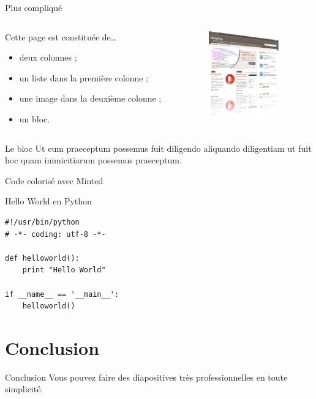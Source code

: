 \documentclass[utf8,compress]{beamer}
\begin{document}
\begin{frame}{Plus compliqué}
\begin{columns}
\begin{column}{0.7\textwidth}
    Cette page est constituée de\dots
    \begin{itemize}
    \item deux colonnes ;
    \item un liste dans la première colonne ;
    \item une image dans la deuxième colonne ;
    \item un bloc.
    \end{itemize}
\end{column}
\begin{column}{0.3\textwidth}
    \begin{figure}[h]
        \includegraphics[width=3cm]{bloghiko-reflet3d.png}
    \end{figure}
\end{column}
\end{columns}
\vspace{1em}
\begin{block}{Le bloc}
    Ut eum praeceptum possemus fuit diligendo aliquando diligentiam ut 
    fuit hoc quam inimicitiarum possemus praeceptum.
\end{block}
\end{frame}

\begin{frame}[containsverbatim]{Code colorisé avec Minted}
\begin{exampleblock}{Hello World en Python}
\begin{verbatim}
#!/usr/bin/python
# -*- coding: utf-8 -*-

def helloworld():
    print "Hello World"

if __name__ == '__main__':
    helloworld()
\end{verbatim}
\end{exampleblock}
\end{frame}

\section{Conclusion}

\begin{frame}{Conclusion}
    Vous pouvez faire des diapositives très professionnelles en toute simplicité.
\end{frame}
\end{document}
